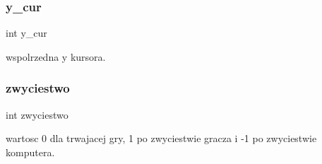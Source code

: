 \subsubsection{y\+\_\+cur}
{\footnotesize\ttfamily int y\+\_\+cur}



wspolrzedna y kursora. 

\mbox{\label{znaki_8c_a6ab179ba1661be3bc6c657dabae93539}} 
\subsubsection{zwyciestwo}
{\footnotesize\ttfamily int zwyciestwo}



wartosc 0 dla trwajacej gry, 1 po zwyciestwie gracza i -\/1 po zwyciestwie komputera. 

